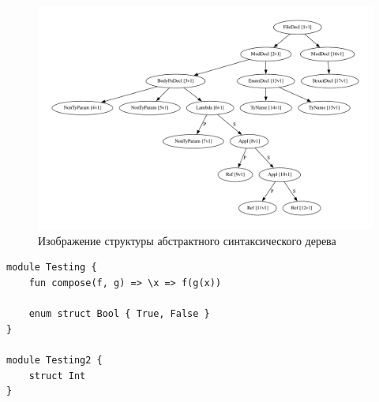 \begin{figure}[H]
    \centering
    \includegraphics[width=\textwidth]{figures/dot}
    \caption{Изображение структуры абстрактного синтаксического дерева}
    \label{fig:ast_dot}
\end{figure}

\begin{lstlisting}[label=lst:kodept, caption={Исходная программа на языке Kodept}]
module Testing {
    fun compose(f, g) => \x => f(g(x))

    enum struct Bool { True, False }
}

module Testing2 {
    struct Int
}
\end{lstlisting}